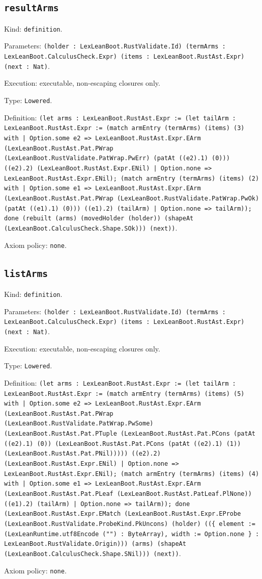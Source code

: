\documentclass[11pt]{article}
\begin{document}
\subsection*{\texttt{resultArms}}
\noindent Kind: \texttt{definition}.\par
\noindent Parameters: \texttt{(holder : LexLeanBoot.RustValidate.Id) (termArms : LexLeanBoot.CalculusCheck.Expr) (items : LexLeanBoot.RustAst.Expr) (next : Nat)}.\par
\noindent Execution: executable, non-escaping closures only.\par
\noindent Type: \texttt{Lowered}.\par
\noindent Definition: \texttt{(let arms : LexLeanBoot.RustAst.Expr := (let tailArm : LexLeanBoot.RustAst.Expr := (match armEntry (termArms) (items) (3) with | Option.some e2 => LexLeanBoot.RustAst.Expr.EArm (LexLeanBoot.RustAst.Pat.PWrap (LexLeanBoot.RustValidate.PatWrap.PwErr) (patAt ((e2).1) (0))) ((e2).2) (LexLeanBoot.RustAst.Expr.ENil) | Option.none => LexLeanBoot.RustAst.Expr.ENil); (match armEntry (termArms) (items) (2) with | Option.some e1 => LexLeanBoot.RustAst.Expr.EArm (LexLeanBoot.RustAst.Pat.PWrap (LexLeanBoot.RustValidate.PatWrap.PwOk) (patAt ((e1).1) (0))) ((e1).2) (tailArm) | Option.none => tailArm)); done (rebuilt (arms) (movedHolder (holder)) (shapeAt (LexLeanBoot.CalculusCheck.Shape.SOk))) (next))}.\par
\noindent Axiom policy: \texttt{none}.\par
\subsection*{\texttt{listArms}}
\noindent Kind: \texttt{definition}.\par
\noindent Parameters: \texttt{(holder : LexLeanBoot.RustValidate.Id) (termArms : LexLeanBoot.CalculusCheck.Expr) (items : LexLeanBoot.RustAst.Expr) (next : Nat)}.\par
\noindent Execution: executable, non-escaping closures only.\par
\noindent Type: \texttt{Lowered}.\par
\noindent Definition: \texttt{(let arms : LexLeanBoot.RustAst.Expr := (let tailArm : LexLeanBoot.RustAst.Expr := (match armEntry (termArms) (items) (5) with | Option.some e2 => LexLeanBoot.RustAst.Expr.EArm (LexLeanBoot.RustAst.Pat.PWrap (LexLeanBoot.RustValidate.PatWrap.PwSome) (LexLeanBoot.RustAst.Pat.PTuple (LexLeanBoot.RustAst.Pat.PCons (patAt ((e2).1) (0)) (LexLeanBoot.RustAst.Pat.PCons (patAt ((e2).1) (1)) (LexLeanBoot.RustAst.Pat.PNil))))) ((e2).2) (LexLeanBoot.RustAst.Expr.ENil) | Option.none => LexLeanBoot.RustAst.Expr.ENil); (match armEntry (termArms) (items) (4) with | Option.some e1 => LexLeanBoot.RustAst.Expr.EArm (LexLeanBoot.RustAst.Pat.PLeaf (LexLeanBoot.RustAst.PatLeaf.PlNone)) ((e1).2) (tailArm) | Option.none => tailArm)); done (LexLeanBoot.RustAst.Expr.EMatch (LexLeanBoot.RustAst.Expr.EProbe (LexLeanBoot.RustValidate.ProbeKind.PkUncons) (holder) ((\{ element := (LexLeanRuntime.utf8Encode ("") : ByteArray), width := Option.none \} : LexLeanBoot.RustValidate.Origin))) (arms) (shapeAt (LexLeanBoot.CalculusCheck.Shape.SNil))) (next))}.\par
\noindent Axiom policy: \texttt{none}.\par
\end{document}
